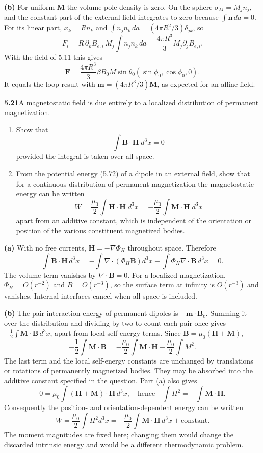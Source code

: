\textbf{(b)} For uniform $\mathbf M$ the volume pole density is zero.
On the sphere $\sigma_M=M_jn_j$, and the constant part of the external
field integrates to zero because $\int\mathbf n\,da=0$.
For its linear part, $x_k=Rn_k$ and
$\int n_jn_k\,da=(4\pi R^2/3)\delta_{jk}$, so
\[
F_i=R\,\partial_kB_{e,i}\,M_j\int n_jn_k\,da
=\frac{4\pi R^3}{3}M_j\partial_jB_{e,i}.
\]
With the field of 5.11 this gives
\[
\boxed{\mathbf F=\frac{4\pi R^3}{3}\beta B_0M\sin\theta_0
(\sin\phi_0,\cos\phi_0,0).}
\]
It equals the loop result with
$\mathbf m=(4\pi R^3/3)\mathbf M$, as expected for an affine field.


\par\bigskip
\noindent\textbf{5.21}\quad A magnetostatic field is due entirely to a localized distribution of permanent magnetization.
\begin{enumerate}
\item[(a)] Show that
\[
\int\mathbf{B}\cdot\mathbf{H}\;d^{3}x=0
\]
provided the integral is taken over all space.
\item[(b)] From the potential energy (5.72) of a dipole in an external field, show that for a continuous distribution of permanent magnetization the magnetostatic energy can be written
\[
W=\frac{\mu_{0}}{2}\int\mathbf{H}\cdot\mathbf{H}\;d^{3}x=-\frac{\mu_{0}}{2}\int\mathbf{M}\cdot\mathbf{H}\;d^{3}x
\]
apart from an additive constant, which is independent of the orientation or position of the various constituent magnetized bodies.
\end{enumerate}
\solution
\textbf{(a)} With no free currents,
$\mathbf H=-\nabla\Phi_H$ throughout space. Therefore
\[
\int\mathbf B\cdot\mathbf H\,d^3x
=-\int\nabla\cdot(\Phi_H\mathbf B)d^3x
+\int\Phi_H\nabla\cdot\mathbf B\,d^3x=0.
\]
The volume term vanishes by $\nabla\cdot\mathbf B=0$.
For a localized magnetization, $\Phi_H=O(r^{-2})$ and
$B=O(r^{-3})$, so the surface term at infinity is $O(r^{-3})$ and
vanishes. Internal interfaces cancel when all space is included.

\textbf{(b)} The pair interaction energy of permanent dipoles is
$-\mathbf m\cdot\mathbf B_e$. Summing it over the distribution and
dividing by two to count each pair once gives
$-\tfrac12\int\mathbf M\cdot\mathbf B\,d^3x$, apart from local
self-energy terms. Since $\mathbf B=\mu_0(\mathbf H+\mathbf M)$,
\[
-\frac12\int\mathbf M\cdot\mathbf B
=-\frac{\mu_0}{2}\int\mathbf M\cdot\mathbf H
-\frac{\mu_0}{2}\int M^2.
\]
The last term and the local self-energy constants are unchanged by
translations or rotations of permanently magnetized bodies.
They may be absorbed into the additive constant specified in the question.
Part (a) also gives
\[
0=\mu_0\int(\mathbf H+\mathbf M)\cdot\mathbf H\,d^3x,
\quad\text{hence}\quad
\int H^2=-\int\mathbf M\cdot\mathbf H.
\]
Consequently the position- and orientation-dependent energy can be written
\[
\boxed{W=\frac{\mu_0}{2}\int H^2d^3x
=-\frac{\mu_0}{2}\int\mathbf M\cdot\mathbf H\,d^3x+\text{constant}.}
\]
The moment magnitudes are fixed here; changing them would change the
discarded intrinsic energy and would be a different thermodynamic problem.


